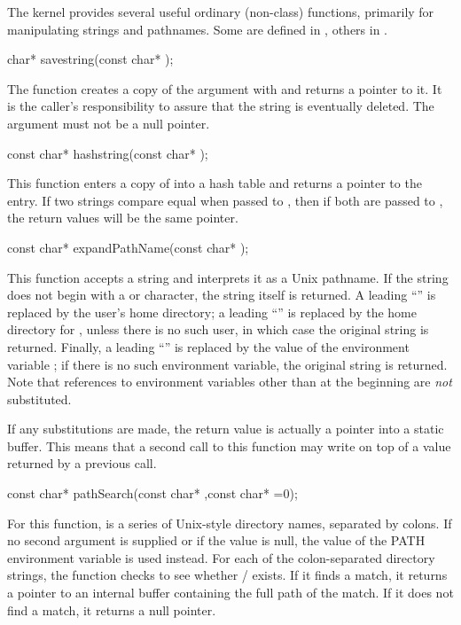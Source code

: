 The kernel provides several useful ordinary (non-class) functions,
primarily for manipulating strings and pathnames.  Some are defined
in , others in .

\begin{example}
char* savestring(const char* );
\end{example}

The  function creates a copy of the  argument
with  and returns a pointer to it.  It is the caller's
responsibility to assure that the string is eventually deleted.  The
argument must not be a null pointer.

\begin{example}
const char* hashstring(const char* );
\end{example}

This function enters a copy of  into a hash table and returns
a pointer to the entry.  If two strings compare equal when passed to
, then if both are passed to , the return
values will be the same pointer.

\begin{example}
const char* expandPathName(const char* );
\end{example}

This function accepts a string and interprets it as a Unix pathname.
If the string does not begin with a \code{~} or \code{$} character,
the string itself is returned.  A leading ``\code{~/}'' is replaced
by the user's home directory; a leading ``'' is
replaced by the home directory for , unless there is no
such user, in which case the original string is returned.  Finally,
a leading ``'' is replaced by the value of the
environment variable ; if there is no such environment
variable, the original string is returned.  Note that references
to environment variables other than at the beginning are \emph{not}
substituted.

If any substitutions are made, the return value is actually a pointer
into a static buffer.  This means that a second call to this function
may write on top of a value returned by a previous call.

\begin{example}
const char* pathSearch(const char* ,const char* =0);
\end{example}

For this function,  is a series of Unix-style directory names,
separated by colons.  If no second argument is supplied or if the value
is null, the value of the PATH environment variable is used instead.
For each of the colon-separated directory strings, the function checks
to see whether / exists.  If it finds a match, it
returns a pointer to an internal buffer containing the full path of the
match.  If it does not find a match, it returns a null pointer.

